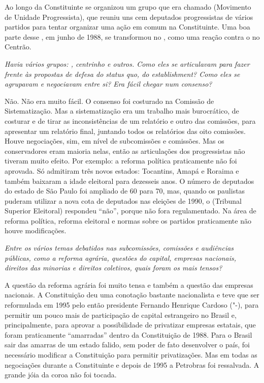 Ao longo da Constituinte se organizou um grupo que era chamado 
(Movimento de Unidade Progressista), que reuniu uns cem deputados
progressistas de vários partidos para tentar organizar uma ação em comum
na Constituinte. Uma boa parte desse , em junho de 1988, se
transformou no , como uma reação contra o  no Centrão.

\medskip

\noindent\emph{Havia vários grupos: , centrinho e outros. Como eles se
articulavam para fazer frente às propostas de defesa do status quo, do
establishment? Como eles se agrupavam e negociavam entre si? Era fácil
chegar num consenso?}

Não. Não era muito fácil. O consenso foi costurado
na Comissão de Sistematização. Mas a sistematização era um trabalho mais
burocrático, de costurar e de tirar as inconsistências de um relatório e
outro das comissões, para apresentar um relatório final, juntando todos
os relatórios das oito comissões. Houve negociações, sim, em nível de
subcomissões e comissões. Mas os conservadores eram maioria nelas, então
as articulações dos progressistas não tiveram muito efeito. Por exemplo:
a reforma política praticamente não foi aprovada. Só admitiram três
novos estados: Tocantins, Amapá e Roraima e também baixaram a idade
eleitoral para dezesseis anos. O número de deputados do estado de São
Paulo foi ampliado de 60 para 70, mas, quando os paulistas puderam
utilizar a nova cota de deputados nas eleições de 1990, o  (Tribunal
Superior Eleitoral) respondeu ``não'', porque não fora regulamentado. Na
área de reforma política, reforma eleitoral e normas sobre os partidos
praticamente não houve modificações.

\medskip

\noindent\emph{Entre os vários temas debatidos nas subcomissões, comissões e
audiências públicas, como a reforma agrária, questões do capital,
empresas nacionais, direitos das minorias e direitos coletivos, quais
foram os mais tensos?}

A questão da reforma agrária foi muito tensa e
também a questão das empresas nacionais. A Constituição deu uma
conotação bastante nacionalista e teve que ser reformulada em 1995 pelo
então presidente Fernando Henrique Cardoso ("-), para permitir um
pouco mais de participação de capital estrangeiro no Brasil e,
principalmente, para aprovar a possibilidade de privatizar empresas
estatais, que foram praticamente ``amarradas'' dentro da Constituição de
1988. Para o Brasil sair das amarras de um estado falido, sem poder de
fato desenvolver o país, foi necessário modificar a Constituição para
permitir privatizações. Mas em todas as negociações durante a
Constituinte e depois de 1995 a Petrobras foi ressalvada. A grande jóia
da coroa não foi tocada.

